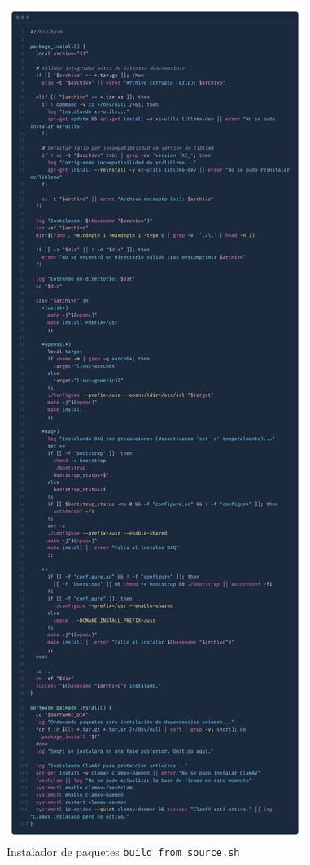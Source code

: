 \documentclass[12pt,a4paper]{report}
\begin{document}
\begin{figure}[H]
	\centering
	\includegraphics[scale=0.065]{script_automatico/5.png}
	\caption{Instalador de paquetes \texttt{build\_from\_source.sh}}
	\label{fig:build-from-source}
\end{figure}
\end{document}
